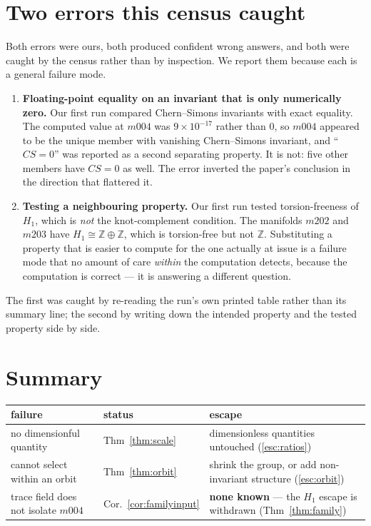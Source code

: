 \documentclass[11pt,a4paper]{article}
\theoremstyle{definition}
\theoremstyle{remark}
\newcommand{\Z}{\mathbb{Z}}
\begin{document}
\section{Two errors this census caught}\label{sec:errors}

Both errors were ours, both produced confident wrong answers, and both were caught by the census
rather than by inspection. We report them because each is a general failure mode.

\begin{enumerate}[leftmargin=1.8em]
\item \textbf{Floating-point equality on an invariant that is only numerically zero.} Our first
      run compared Chern--Simons invariants with exact equality. The computed value at $m004$ was
      $9\times10^{-17}$ rather than $0$, so $m004$ appeared to be the unique member with vanishing
      Chern--Simons invariant, and ``$CS=0$'' was reported as a second separating property. It is
      not: five other members have $CS=0$ as well. The error inverted the paper's conclusion in
      the direction that flattered it.
\item \textbf{Testing a neighbouring property.} Our first run tested torsion-freeness of $H_1$,
      which is \emph{not} the knot-complement condition. The manifolds $m202$ and $m203$ have
      $H_1\cong\Z\oplus\Z$, which is torsion-free but not $\Z$. Substituting a property that is
      easier to compute for the one actually at issue is a failure mode that no amount of care
      \emph{within} the computation detects, because the computation is correct --- it is
      answering a different question.
\end{enumerate}

The first was caught by re-reading the run's own printed table rather than its summary line; the
second by writing down the intended property and the tested property side by side.

\section{Summary}

\begin{center}
\begin{tabular}{@{}p{4.5cm}lp{5.4cm}@{}}
\toprule
failure & status & escape \\
\midrule
no dimensionful quantity & Thm~\ref{thm:scale} & dimensionless quantities untouched (\ref{esc:ratios}) \\
cannot select within an orbit & Thm~\ref{thm:orbit} & shrink the group, or add non-invariant structure (\ref{esc:orbit}) \\
trace field does not isolate $m004$ & Cor.~\ref{cor:familyinput} & \textbf{none known} --- the $H_1$ escape is withdrawn (Thm~\ref{thm:family}) \\
\bottomrule
\end{tabular}
\end{center}
\end{document}

